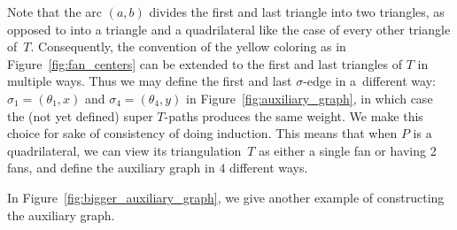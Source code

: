 \documentclass[11pt]{article}
\numberwithin{equation}{section}
\numberwithin{equation}{section}
\begin{document}
\begin{Remark}\rm
 Note that the arc $(a,b)$ divides the first and last triangle into two triangles, as opposed to into a triangle and a quadrilateral
 like the case of every other triangle of~$T$. Consequently, the convention of the yellow coloring as in Figure~\ref{fig:fan_centers}
 can be extended to the first and last triangles of $T$ in multiple ways.
 Thus we may define the first and last $\sigma$-edge in a~different way: $\sigma_1=(\theta_1,x)$ and $\sigma_4=(\theta_4,y)$ in Figure~\ref{fig:auxiliary_graph},
 in which case the (not yet defined) super $T$-paths produces the same weight. We make this choice for sake of consistency of doing induction.
 This means that when $P$ is a quadrilateral, we can view its triangulation~$T$ as either a single fan or having 2 fans, and define the auxiliary graph in $4$ different ways.
\end{Remark}
In Figure~\ref{fig:bigger_auxiliary_graph}, we give another example of constructing the auxiliary graph.
\end{document}
